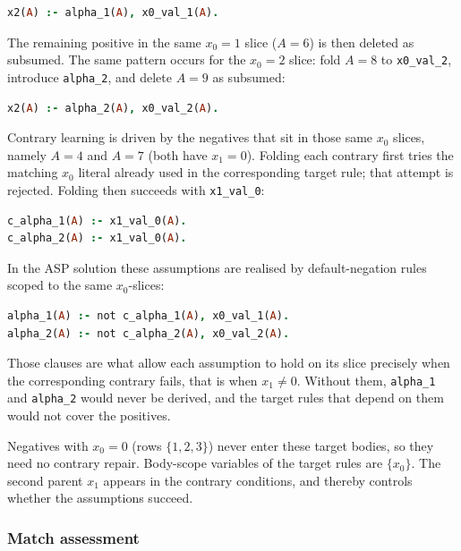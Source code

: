 \documentclass[11pt]{article}
\begin{document}
\begin{lstlisting}[style=logic,language=Prolog]
x2(A) :- alpha_1(A), x0_val_1(A).
\end{lstlisting}

The remaining positive in the same \(x_0=1\) slice (\(A=6\)) is then deleted as subsumed. The same pattern occurs for the \(x_0=2\) slice: fold \(A=8\) to \texttt{x0\_val\_2}, introduce \texttt{alpha\_2}, and delete \(A=9\) as subsumed:

\begin{lstlisting}[style=logic,language=Prolog]
x2(A) :- alpha_2(A), x0_val_2(A).
\end{lstlisting}

Contrary learning is driven by the negatives that sit in those same \(x_0\) slices, namely \(A=4\) and \(A=7\) (both have \(x_1=0\)). Folding each contrary first tries the matching \(x_0\) literal already used in the corresponding target rule; that attempt is rejected. Folding then succeeds with \texttt{x1\_val\_0}:

\begin{lstlisting}[style=logic,language=Prolog]
c_alpha_1(A) :- x1_val_0(A).
c_alpha_2(A) :- x1_val_0(A).
\end{lstlisting}

In the ASP solution these assumptions are realised by default-negation rules scoped to the same \(x_0\)-slices:

\begin{lstlisting}[style=logic,language=Prolog]
alpha_1(A) :- not c_alpha_1(A), x0_val_1(A).
alpha_2(A) :- not c_alpha_2(A), x0_val_2(A).
\end{lstlisting}

Those clauses are what allow each assumption to hold on its slice precisely when the corresponding contrary fails, that is when \(x_1\neq 0\). Without them, \texttt{alpha\_1} and \texttt{alpha\_2} would never be derived, and the target rules that depend on them would not cover the positives.

Negatives with \(x_0=0\) (rows \(\{1,2,3\}\)) never enter these target bodies, so they need no contrary repair. Body-scope variables of the target rules are \(\{x_0\}\). The second parent \(x_1\) appears in the contrary conditions, and thereby controls whether the assumptions succeed.

\subsubsection{Match assessment}
\end{document}
